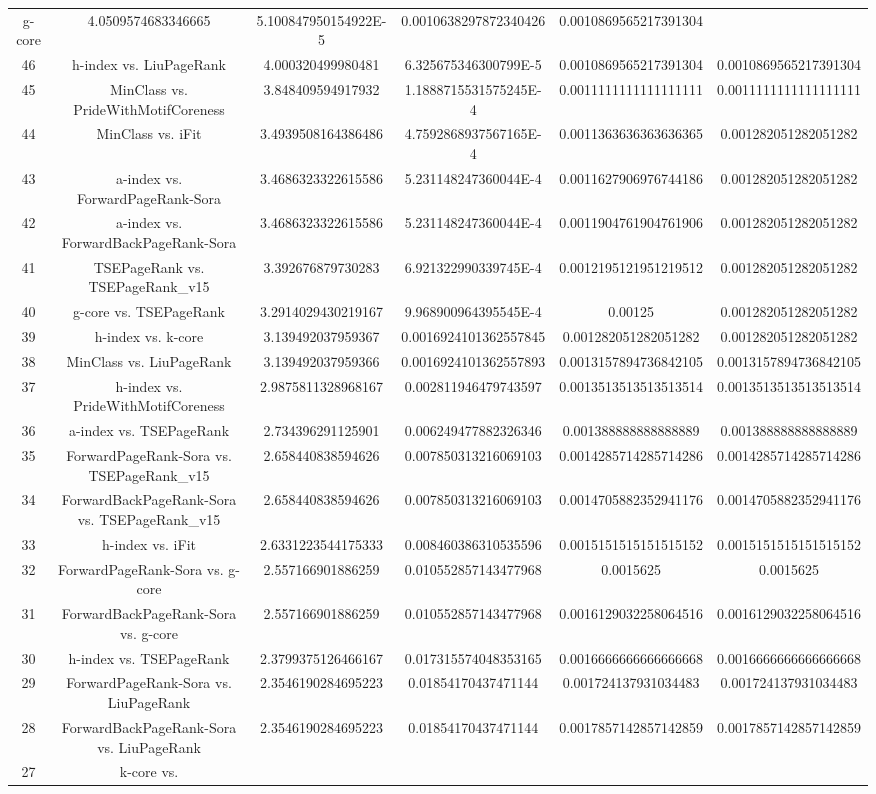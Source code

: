 \documentclass[a4paper,10pt]{article}
\begin{document}
\begin{landscape}
\begin{table}[!htp]
\begin{tabular}{cccccc}
g-core&4.0509574683346665&5.100847950154922E-5&0.0010638297872340426&0.0010869565217391304\\46&h-index vs. LiuPageRank&4.000320499980481&6.325675346300799E-5&0.0010869565217391304&0.0010869565217391304\\45&MinClass vs. PrideWithMotifCoreness&3.848409594917932&1.1888715531575245E-4&0.0011111111111111111&0.0011111111111111111\\44&MinClass vs. iFit&3.4939508164386486&4.7592868937567165E-4&0.0011363636363636365&0.001282051282051282\\43&a-index vs. ForwardPageRank-Sora&3.4686323322615586&5.231148247360044E-4&0.0011627906976744186&0.001282051282051282\\42&a-index vs. ForwardBackPageRank-Sora&3.4686323322615586&5.231148247360044E-4&0.0011904761904761906&0.001282051282051282\\41&TSEPageRank vs. TSEPageRank_v15&3.392676879730283&6.921322990339745E-4&0.0012195121951219512&0.001282051282051282\\40&g-core vs. TSEPageRank&3.2914029430219167&9.968900964395545E-4&0.00125&0.001282051282051282\\39&h-index vs. k-core&3.139492037959367&0.0016924101362557845&0.001282051282051282&0.001282051282051282\\38&MinClass vs. LiuPageRank&3.139492037959366&0.0016924101362557893&0.0013157894736842105&0.0013157894736842105\\37&h-index vs. PrideWithMotifCoreness&2.9875811328968167&0.002811946479743597&0.0013513513513513514&0.0013513513513513514\\36&a-index vs. TSEPageRank&2.734396291125901&0.006249477882326346&0.001388888888888889&0.001388888888888889\\35&ForwardPageRank-Sora vs. TSEPageRank_v15&2.658440838594626&0.007850313216069103&0.0014285714285714286&0.0014285714285714286\\34&ForwardBackPageRank-Sora vs. TSEPageRank_v15&2.658440838594626&0.007850313216069103&0.0014705882352941176&0.0014705882352941176\\33&h-index vs. iFit&2.6331223544175333&0.008460386310535596&0.0015151515151515152&0.0015151515151515152\\32&ForwardPageRank-Sora vs. g-core&2.557166901886259&0.010552857143477968&0.0015625&0.0015625\\31&ForwardBackPageRank-Sora vs. g-core&2.557166901886259&0.010552857143477968&0.0016129032258064516&0.0016129032258064516\\30&h-index vs. TSEPageRank&2.3799375126466167&0.017315574048353165&0.0016666666666666668&0.0016666666666666668\\29&ForwardPageRank-Sora vs. LiuPageRank&2.3546190284695223&0.01854170437471144&0.001724137931034483&0.001724137931034483\\28&ForwardBackPageRank-Sora vs. LiuPageRank&2.3546190284695223&0.01854170437471144&0.0017857142857142859&0.0017857142857142859\\27&k-core vs. 
\end{tabular}
\end{table}
\end{landscape}
\end{document}
